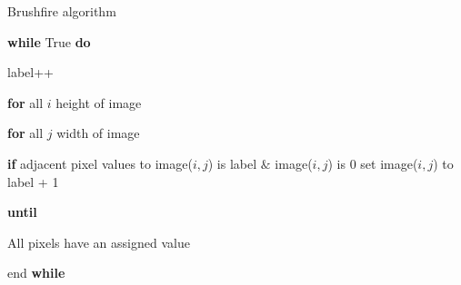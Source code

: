 \documentclass[../Head/Main.tex]{subfiles}
\begin{document}
\begin{Pseudo}{Brushfire algorithm}{}

	\textbf{while} True \textbf{do}
	

	\begin{Indentation}
	\item label++
	\begin{Indentation}

	\item \textbf{for} all $i$ height of image 
	\begin{Indentation}
	\item \textbf{for} all $j$ width of image 
	\item \textbf{if} adjacent pixel values to image($i, j $) is label $\&$ image($i, j$) is 0 set image($i, j $) to label + 1	
	
	\end{Indentation}
	
	\item \textbf{until}
				
	\begin{Indentation}
	\item All pixels have an assigned value 
	\end{Indentation}

	\end{Indentation}
	
	 \item end \textbf{while}

	\end{Indentation}
	
\end{Pseudo}
\end{document}
